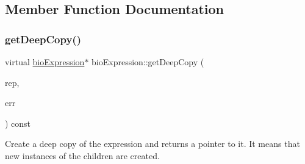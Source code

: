 \subsection{Member Function Documentation}
\mbox{\label{classbio_expression_a4ee1b8add634078a02eaae26cd40dcc8}} 
\subsubsection{\texorpdfstring{get\+Deep\+Copy()}{getDeepCopy()}}
{\footnotesize\ttfamily virtual \hyperlink{classbio_expression}{bio\+Expression}$\ast$ bio\+Expression\+::get\+Deep\+Copy (\begin{DoxyParamCaption}\item[{\hyperlink{classbio_expression_repository}{bio\+Expression\+Repository} $\ast$}]{rep,  }\item[{pat\+Error $\ast$\&}]{err }\end{DoxyParamCaption}) const\hspace{0.3cm}{\ttfamily [virtual]}}

Create a deep copy of the expression and returns a pointer to it. It means that new instances of the children are created. 

